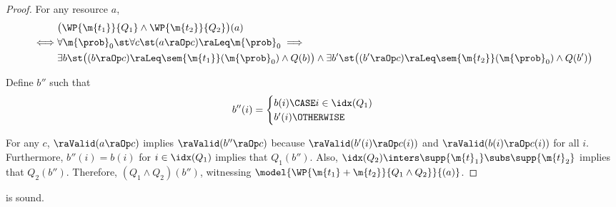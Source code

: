 \begin{proof}
     For any resource $a$,
      \begin{align*}
        & \bigl(\WP {\m{t_1}} {Q_1} \land   \WP {\m{t_2}} {Q_2}\bigr)(a)
        \\
        \iff &
        \forall \m{\prob}_0 \st
        \forall c \st
        (a \raOp c) \raLeq \m{\prob}_0
        \implies \\
             & \exists b \st
        \bigl(
          (b \raOp c) \raLeq \sem{\m{t_1}}(\m{\prob}_0)
          \land
          Q(b)
       \bigr) \land
         \exists b' \st
        \bigl(
          (b' \raOp c) \raLeq \sem{\m{t_2}}(\m{\prob}_0)
          \land
          Q(b')
       \bigr)
      \end{align*}

      Define $b''$ such that
      \begin{align*}
        b''(i) & =
        \begin{cases}
          b(i) \CASE i \in \idx(Q_1) \\
          b'(i) \OTHERWISE
        \end{cases}
      \end{align*}

      For any $c$, $\raValid(a \raOp c)$ implies
       $\raValid(b'' \raOp c)$ because
       $\raValid(b'(i) \raOp c(i))$ and
       $\raValid(b(i) \raOp c(i))$ for all $i$.
       Furthermore,
       $b''(i) = b(i)$ for $i \in \idx(Q_1)$ implies
       that $Q_1(b'')$.
       Also,
       $\idx(Q_2) \inters \supp{\m{t}_1} \subs \supp{\m{t}_2}$
       implies
       that $Q_2(b'')$.
       Therefore, $(Q_1 \land Q_2)(b'')$, witnessing
       $\model{\WP {\m{t_1} + \m{t_2}} {Q_1 \land Q_2}}{(a)} $.
\end{proof} \begin{lemma}
\label{proof:c-wp-swap}
   is sound.
\end{lemma}

